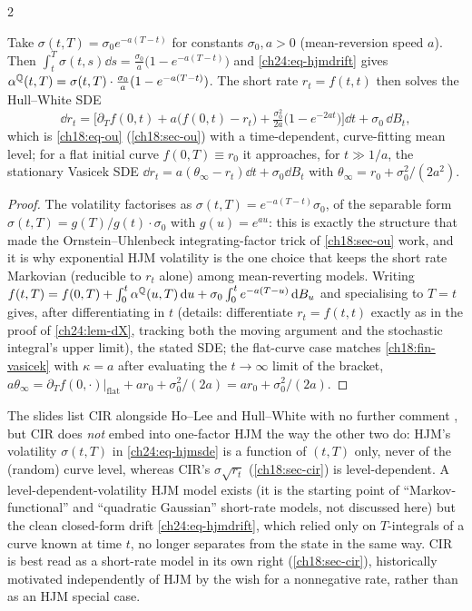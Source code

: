 \begin{paracol}{2}
\begin{proposition}\label{ch24:prop-vasicek}
Take $\sigma(t,T)=\sigma_0e^{-a(T-t)}$ for constants $\sigma_0,a>0$ (mean-reversion speed $a$). Then $\int_t^T\sigma(t,s)\dd s=\tfrac{\sigma_0}{a}\bigl(1-e^{-a(T-t)}\bigr)$ and \eqref{ch24:eq-hjmdrift} gives $\alpha^{\mathbb{Q}}(t,T)=\sigma(t,T)\cdot\tfrac{\sigma_0}{a}(1-e^{-a(T-t)})$. The short rate $r_t=f(t,t)$ then solves the Hull--White SDE
\begin{equation}\label{ch24:eq-hw}
  \dd r_t=\bigl[\partial_Tf(0,t)+a\bigl(f(0,t)-r_t\bigr)+\tfrac{\sigma_0^2}{2a}\bigl(1-e^{-2at}\bigr)\bigr]\dd t+\sigma_0\,\dd B_t ,
\end{equation}
which is \eqref{ch18:eq-ou} (\cref{ch18:sec-ou}) with a time-dependent, curve-fitting mean level; for a flat initial curve $f(0,T)\equiv r_0$ it approaches, for $t\gg1/a$, the stationary Vasicek SDE $\dd r_t=a(\theta_\infty-r_t)\dd t+\sigma_0\dd B_t$ with $\theta_\infty=r_0+\sigma_0^2/(2a^2)$.
\end{proposition}
\begin{proof}
The volatility factorises as $\sigma(t,T)=e^{-a(T-t)}\sigma_0$, of the separable form $\sigma(t,T)=g(T)/g(t)\cdot\sigma_0$ with $g(u)=e^{au}$: this is exactly the structure that made the Ornstein--Uhlenbeck integrating-factor trick of \cref{ch18:sec-ou} work, and it is why exponential HJM volatility is the one choice that keeps the short rate Markovian (reducible to $r_t$ alone) among mean-reverting models. Writing $f(t,T)=f(0,T)+\int_0^t\alpha^{\mathbb{Q}}(u,T)\,\mathrm{d} u+\sigma_0\int_0^te^{-a(T-u)}\,\mathrm{d} B_u$ and specialising to $T=t$ gives, after differentiating in $t$ (details: differentiate $r_t=f(t,t)$ exactly as in the proof of \cref{ch24:lem-dX}, tracking both the moving argument and the stochastic integral's upper limit), the stated SDE; the flat-curve case matches \cref{ch18:fin-vasicek} with $\kappa=a$ after evaluating the $t\to\infty$ limit of the bracket, $a\theta_\infty=\partial_Tf(0,\cdot)|_{\text{flat}}+ar_0+\sigma_0^2/(2a)=ar_0+\sigma_0^2/(2a)$.
\end{proof}

\begin{coursenote}\label{ch24:cn-cir}
The slides list CIR alongside Ho--Lee and Hull--White with no further comment , but CIR does \emph{not} embed into one-factor HJM the way the other two do: HJM's volatility $\sigma(t,T)$ in \eqref{ch24:eq-hjmsde} is a function of $(t,T)$ only, never of the (random) curve level, whereas CIR's $\sigma\sqrt{r_t}$ (\cref{ch18:sec-cir}) is level-dependent. A level-dependent-volatility HJM model exists (it is the starting point of ``Markov-functional'' and ``quadratic Gaussian'' short-rate models, not discussed here) but the clean closed-form drift \eqref{ch24:eq-hjmdrift}, which relied only on $T$-integrals of a curve known at time $t$, no longer separates from the state in the same way. CIR is best read as a short-rate model in its own right (\cref{ch18:sec-cir}), historically motivated independently of HJM by the wish for a nonnegative rate, rather than as an HJM special case.
\end{coursenote}


\end{paracol}
